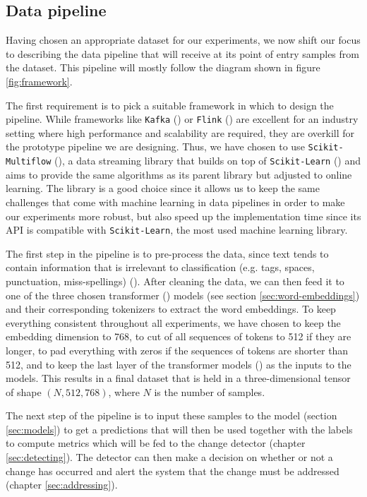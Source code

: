 \documentclass[12pt]{extreport}
\begin{document}
\subsection{Data pipeline}

Having chosen an appropriate dataset for our experiments, we now shift our focus to describing the data pipeline that will receive at its point of entry samples from the dataset. This pipeline will mostly follow the diagram shown in figure \ref{fig:framework}.

The first requirement is to pick a suitable framework in which to design the pipeline. While frameworks like \texttt{Kafka} (\cite{kafka}) or \texttt{Flink} (\cite{flink}) are excellent for an industry setting where high performance and scalability are required, they are overkill for the prototype pipeline we are designing. Thus, we have chosen to use \texttt{Scikit-Multiflow} (\cite{skmultiflow}), a data streaming library that builds on top of \texttt{Scikit-Learn} (\cite{sklearn}) and aims to provide the same algorithms as its parent library but adjusted to online learning. The library is a good choice since it allows us to keep the same challenges that come with machine learning in data pipelines in order to make our experiments more robust, but also speed up the implementation time since its API is compatible with \texttt{Scikit-Learn}, the most used machine learning library.

The first step in the pipeline is to pre-process the data, since text tends to contain information that is irrelevant to classification (e.g. tags, spaces, punctuation, miss-spellings) (\cite{textclassification}). After cleaning the data, we can then feed it to one of the three chosen transformer (\cite{huggingface}) models (see section \ref{sec:word-embeddings}) and their corresponding tokenizers to extract the word embeddings. To keep everything consistent throughout all experiments, we have chosen to keep the embedding dimension to 768, to cut of all sequences of tokens to 512 if they are longer, to pad everything with zeros if the sequences of tokens are shorter than 512, and to keep the last layer of the transformer models (\cite{attention}) as the inputs to the models. This results in a final dataset that is held in a three-dimensional tensor of shape $(N, 512, 768)$, where $N$ is the number of samples.

The next step of the pipeline is to input these samples to the model (section \ref{sec:models}) to get a predictions that will then be used together with the labels to compute metrics which will be fed to the change detector (chapter \ref{sec:detecting}). The detector can then make a decision on whether or not a change has occurred and alert the system that the change must be addressed (chapter \ref{sec:addressing}).
\end{document}
